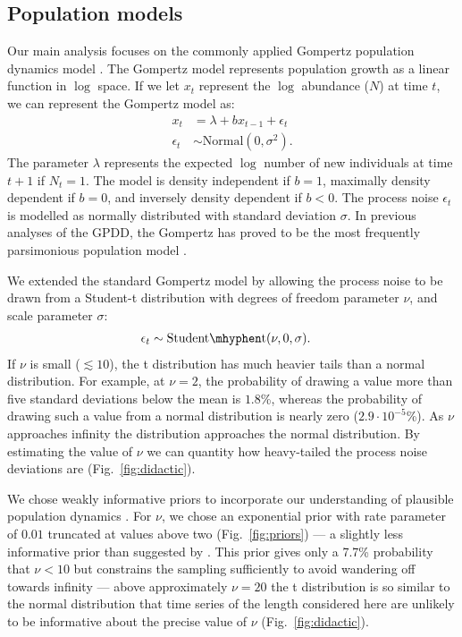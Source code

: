 \subsection{Population models}

Our main analysis focuses on the commonly applied Gompertz population dynamics
model \citep[e.g.][]{knape2012,dennis2014,connors2014}. The Gompertz model
represents population growth as a linear function in $\log$ space. If we let
$x_t$ represent the $\log$ abundance ($N$) at time $t$, we can represent the Gompertz
model as:
\begin{align*}
x_t &= \lambda + b x_{t-1} + \epsilon_t\\
\epsilon_t &\sim \mathrm{Normal}(0, \sigma^2).
\end{align*}
The parameter $\lambda$ represents the expected $\log$ number of new
individuals at time $t + 1$ if $N_t = 1$. The model is density independent if
$b = 1$, maximally density dependent if $b = 0$, and inversely density
dependent if $b < 0$. The process noise $\epsilon_t$ is modelled as normally
distributed with standard deviation $\sigma$. In previous analyses of the GPDD,
the Gompertz has proved to be the most frequently parsimonious population model
\citep{brook2006}.

We extended the standard Gompertz model by allowing the process noise to be
drawn from a Student-t distribution with degrees of freedom parameter $\nu$,
and scale parameter $\sigma$:
\begin{align*}
\epsilon_t &\sim \mathrm{Student\mhyphen t}(\nu, 0, \sigma).
\end{align*}
If $\nu$ is small ($\lesssim 10$), the t distribution has much heavier tails
than a normal distribution. For example, at $\nu = 2$, the probability of
drawing a value more than five standard deviations below the mean is $1.8$\%,
whereas the probability of drawing such a value from a normal distribution is
nearly zero ($2.9\cdot10^{-5}$\%). As $\nu$ approaches infinity the
distribution approaches the normal distribution. By estimating the value of
$\nu$ we can quantity how heavy-tailed the process noise deviations are
(Fig.~\ref{fig:didactic}).

We chose weakly informative priors to incorporate our understanding of
plausible population dynamics \citep[Supporting Material]{gelman2014}. For
$\nu$, we chose an exponential prior with rate parameter of $0.01$ truncated at
values above two (Fig.~\ref{fig:priors}) --- a slightly less informative prior
than suggested by \citet{fernandez1998}. This prior gives only a 7.7\%
probability that $\nu < 10$ but constrains the sampling sufficiently to avoid
wandering off towards infinity --- above approximately $\nu = 20$ the
t distribution is so similar to the normal distribution that time series of the
length considered here are unlikely to be informative about the precise value
of $\nu$ (Fig.~\ref{fig:didactic}).

